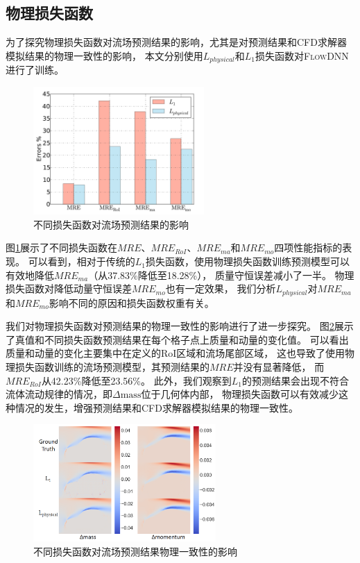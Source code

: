\subsection{物理损失函数}\label{phy_effect}

为了探究物理损失函数对流场预测结果的影响，尤其是对预测结果和CFD求解器模拟结果的物理一致性的影响，
本文分别使用$L_{physical}$和$L_{1}$损失函数对\textsc{FlowDNN}进行了训练。

\begin{figure}[htp]
	\centering
	\includegraphics[width=0.58\textwidth]{./figures/data/data_pre/loss_comp.pdf}
	\caption{不同损失函数对流场预测结果的影响}
	\label{fig:phy_bar_comp}
\end{figure}

\noindent 图\ref{fig:phy_bar_comp}展示了不同损失函数在$MRE$、$MRE_{RoI}$、$MRE_{ma}$和$MRE_{mo}$四项性能指标的表现。
可以看到，相对于传统的$L_{1}$损失函数，使用物理损失函数训练预测模型可以有效地降低$MRE_{ma}$（从37.83\%降低至18.28\%），
质量守恒误差减小了一半。
物理损失函数对降低动量守恒误差$MRE_{mo}$也有一定效果，
我们分析$L_{physical}$对$MRE_{ma}$和$MRE_{mo}$影响不同的原因和损失函数权重有关。

我们对物理损失函数对预测结果的物理一致性的影响进行了进一步探究。
图\ref{fig:phy_hotmap}展示了真值和不同损失函数预测结果在每个格子点上质量和动量的变化值。
可以看出质量和动量的变化主要集中在定义的RoI区域和流场尾部区域，
这也导致了使用物理损失函数训练的流场预测模型，其预测结果的$MRE$并没有显著降低，
而$MRE_{RoI}$从42.23\%降低至23.56\%。
此外，我们观察到$L_{1}$的预测结果会出现不符合流体流动规律的情况，即$\Delta \mathrm{mass}$位于几何体内部，
物理损失函数可以有效减少这种情况的发生，增强预测结果和CFD求解器模拟结果的物理一致性。


\begin{figure}[htp]
	\centering
	\includegraphics[width=0.62\textwidth]{./figures/data/loss_comp_case/loss_comp.png}
	\caption{不同损失函数对流场预测结果物理一致性的影响}	
	\label{fig:phy_hotmap}	
\end{figure}


